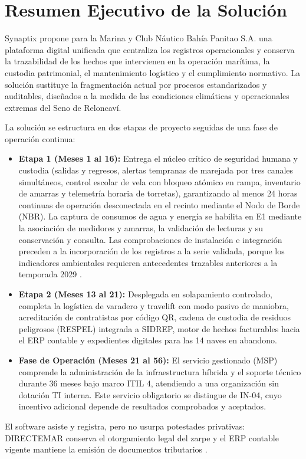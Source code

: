 \section{Resumen Ejecutivo de la Solución}
Synaptix propone para la Marina y Club Náutico Bahía Panitao S.A. una plataforma digital unificada que centraliza los registros operacionales y conserva la trazabilidad de los hechos que intervienen en la operación marítima, la custodia patrimonial, el mantenimiento logístico y el cumplimiento normativo. La solución sustituye la fragmentación actual por procesos estandarizados y auditables, diseñados a la medida de las condiciones climáticas y operacionales extremas del Seno de Reloncaví.
\begin{resumenejecutivo}
La solución se estructura en dos etapas de proyecto seguidas de una fase de operación continua:
\begin{itemize}
    \item \textbf{Etapa 1 (Meses 1 al 16):} Entrega el núcleo crítico de seguridad humana y custodia (salidas y regresos, alertas tempranas de marejada por tres canales simultáneos, control escolar de vela con bloqueo atómico en rampa, inventario de amarras y telemetría horaria de torretas), garantizando al menos 24 horas continuas de operación desconectada en el recinto mediante el Nodo de Borde (NBR). La captura de consumos de agua y energía se habilita en E1 mediante la asociación de medidores y amarras, la validación de lecturas y su conservación y consulta. Las comprobaciones de instalación e integración preceden a la incorporación de los registros a la serie validada, porque los indicadores ambientales requieren antecedentes trazables anteriores a la temporada 2029 \parencite[sec.~13.2; cap.~15, RT-05.10]{caso07}.
    \item \textbf{Etapa 2 (Meses 13 al 21):} Desplegada en solapamiento controlado, completa la logística de varadero y travelift con modo pasivo de maniobra, acreditación de contratistas por código QR, cadena de custodia de residuos peligrosos (RESPEL) integrada a SIDREP, motor de hechos facturables hacia el ERP contable y expedientes digitales para las 14 naves en abandono.
    \item \textbf{Fase de Operación (Meses 21 al 56):} El servicio gestionado (MSP) comprende la administración de la infraestructura híbrida y el soporte técnico durante 36 meses bajo marco ITIL 4, atendiendo a una organización sin dotación TI interna. Este servicio obligatorio se distingue de IN-04, cuyo incentivo adicional depende de resultados comprobados y aceptados.
\end{itemize}
El software asiste y registra, pero no usurpa potestades privativas: DIRECTEMAR conserva el otorgamiento legal del zarpe y el ERP contable vigente mantiene la emisión de documentos tributarios \parencites[art.~16, pp.~11--12]{bases-admin}[caps.~10 y 13]{caso07}.
\end{resumenejecutivo}

